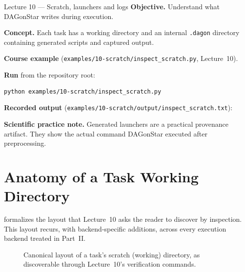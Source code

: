\begin{lessonbox}{Lecture 10 --- Scratch, launchers and logs}
\textbf{Objective.} Understand what DAGonStar writes during execution.

\textbf{Concept.} Each task has a working directory and an internal
\texttt{.dagon} directory containing generated scripts and captured output.

\textbf{Course example} (\texttt{examples/10-scratch/inspect\_scratch.py}, Lecture~10).


\textbf{Run} from the repository root:
\begin{lstlisting}[style=bash]
python examples/10-scratch/inspect_scratch.py
\end{lstlisting}

\textbf{Recorded output} (\texttt{examples/10-scratch/output/inspect\_scratch.txt}):


\textbf{Scientific practice note.} Generated launchers are a practical
provenance artifact. They show the actual command DAGonStar executed after
preprocessing.
\end{lessonbox}

\section{Anatomy of a Task Working Directory}

 formalizes the layout that Lecture~10 asks the reader to
discover by inspection. This layout recurs, with backend-specific additions,
across every execution backend treated in Part~II.

\begin{figure}[h]
\centering
{}
\caption{Canonical layout of a task's scratch (working) directory, as
discoverable through Lecture~10's verification commands.}
\label{fig:task-dir}
\end{figure}

